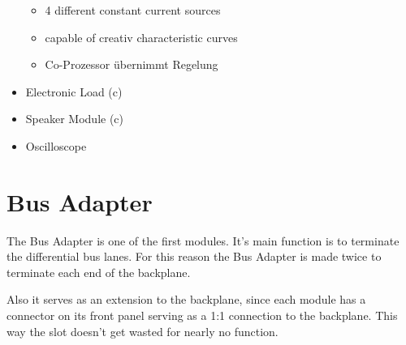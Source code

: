 \begin{itemize}
\begin{itemize}
		\item 4 different constant current sources
		\item capable of creativ characteristic curves
		\item Co-Prozessor übernimmt Regelung
	\end{itemize}
	\item Electronic Load (c)
	\item Speaker Module (c)
	\item Oscilloscope
\end{itemize}


\section{Bus Adapter}
The Bus Adapter is one of the first modules. It's main function is to terminate the differential bus lanes. For this reason the Bus Adapter is made twice to terminate each end of the backplane. 

Also it serves as an extension to the backplane, since each module has a connector on its front panel serving as a 1:1 connection to the backplane. This way the slot doesn't get wasted for nearly no function.

